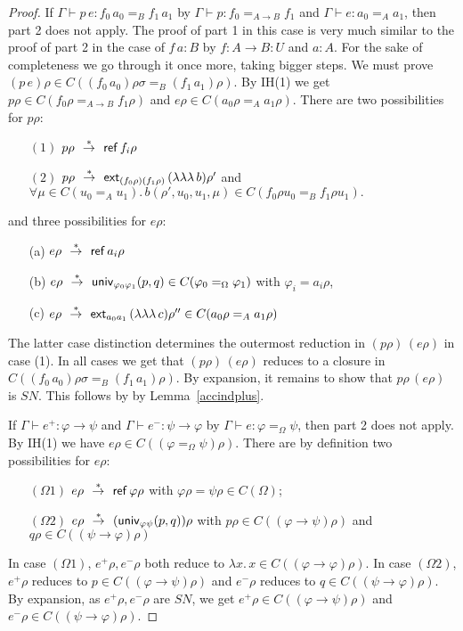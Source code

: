\documentclass[10pt,a4paper]{article}
\newcommand{\unphsi}{{\univ_{\varphi\psi}}}
\newcommand{\unphis}{{\univ_{\varphi_0\varphi_1}}}
\newcommand{\extas}{{\ext_{a_0 a_1}}}
\newcommand{\rtr}{~~{\stackrel{*}{\to}}~~}
\newcommand{\SN}{\mathit{SN}}
\newcommand{\Ref}{{\sf ref}}
\newcommand{\ext}{{\sf ext}}
\newcommand{\univ}{{\sf univ}}
\begin{document}
\begin{proof}
If $\Gamma\vdash p\,e: f_0\,a_0 =_B f_1\,a_1$ by 
$\Gamma\vdash p: f_0 =_{A\to B} f_1$ and $\Gamma\vdash e : a_0 =_A a_1$,
then part 2 does not apply.
The proof of part 1 in this case is very much similar to 
the proof of part 2 in the case of $f\,a : B$ by $f: A\to B : U$ and $a:A$. 
For the sake of completeness we go through it once more, taking bigger steps.
We must prove $(p\,e)\rho\in C((f_0\,a_0)\rho\sigma =_B (f_1\,a_1)\rho)$.
By IH(1) we get $p\rho\in C(f_0\rho =_{A\to B} f_1\rho)$
and $e\rho\in C(a_0\rho =_{A} a_1\rho)$.
There are two possibilities for $p\rho$:
\begin{enumerate}
  \item[$(1)$] $p\rho \rtr \Ref\,f_i\rho$
  \item[$(2)$] $p\rho \rtr \ext_{(f_0\rho)(f_1\rho)}\,(\lambda\lambda\lambda\,b)\rho'$ and 
  $\forall\mu\in C(u_0 =_A u_1).\,b(\rho',u_0,u_1,\mu) \in C(f_0\rho u_0 =_B f_1\rho u_1).$
\end{enumerate}
and three possibilities for $e\rho$:
\begin{enumerate}
  \item[(a)] $e\rho \rtr \Ref\,a_i\rho$ 
  \item[(b)] $e\rho \rtr \unphis(p,q)\in C(\varphi_0 =_\Omega \varphi_1)$ with $\varphi_i = a_i\rho$,
  \item[(c)] $e\rho \rtr \extas\,(\lambda\lambda\lambda\,c)\rho'' \in C(a_0\rho =_A a_1\rho)$
\end{enumerate}
The latter case distinction determines the outermost reduction in $(p\rho)\,(e\rho)$
in case (1). In all cases we get that $(p\rho)\,(e\rho)$ reduces to a closure in 
$C((f_0\,a_0)\rho\sigma =_B (f_1\,a_1)\rho)$.
By expansion, it remains to show that $p\rho\,(e\rho)$
is $\SN$. This follows by by Lemma~\ref{accindplus}.

If $\Gamma\vdash e^+: \varphi\to\psi$ and $\Gamma\vdash e^-: \psi\to\varphi$
by $\Gamma\vdash e: \varphi =_{\Omega} \psi$, then part 2 does not apply. 
By IH(1) we have $e\rho\in C((\varphi =_{\Omega} \psi)\rho)$.
There are by definition two possibilities for $e\rho$:
\begin{enumerate}
  \item[$(\Omega1)$] $e\rho \rtr \Ref\,\varphi\rho$ with  $\varphi\rho = \psi\rho \in C(\Omega)$;
  \item[$(\Omega2)$] $e\rho \rtr (\unphsi(p,q))\rho$ with
                   $p\rho\in C((\varphi\to\psi)\rho)$ and $q\rho\in C((\psi\to\varphi)\rho)$
\end{enumerate}
In case $(\Omega1)$, $e^+\rho,e^-\rho$ both reduce to $\lambda x.\,x \in C((\varphi\to\varphi)\rho)$.
In case $(\Omega2)$, $e^+\rho$ reduces to $p \in C((\varphi\to\psi)\rho)$
and $e^-\rho$ reduces to $q \in C((\psi\to\varphi)\rho)$.
By expansion, as $e^+\rho,e^-\rho$ are $\SN$, 
we get $e^+\rho\in C((\varphi\to\psi)\rho)$
and $e^-\rho\in C((\psi\to\varphi)\rho)$.


\end{proof}
\end{document}
